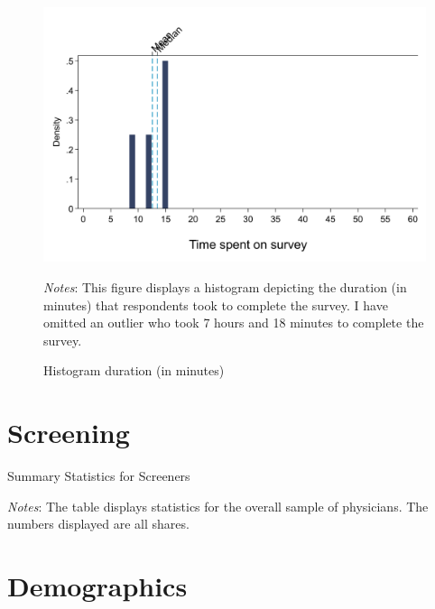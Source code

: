 \documentclass[11pt]{article}
\theoremstyle{definition}
\begin{document}
\begin{figure}[H]
	\centering
	\caption{Histogram duration (in minutes)}
	\label{fig:hist_duration}
	\begin{adjustbox}{max width=\textwidth}
		\includegraphics{Pre-Survey/figures/hist_duration.pdf}
	\end{adjustbox}
	\parbox{.9\linewidth}{
		\vspace{.2cm}
		\scriptsize{\emph{Notes}: This figure displays a histogram depicting the duration (in minutes) that respondents took to complete the survey. I have omitted an outlier who took 7 hours and 18 minutes to complete the survey.}
	}
\end{figure}

\clearpage

\section{Screening}\label{demo}

\begin{table}[H]
    \centering
    \caption{Summary Statistics for Screeners}
    	\begin{adjustbox}{max width=0.8\textwidth}

\end{adjustbox}
     \parbox{.9\linewidth}{
        	\vspace{.2cm}
        		\scriptsize{\scriptsize{{\emph{Notes}: The table displays statistics for the overall sample of physicians. The numbers displayed are all shares.}}}}
    \label{tab:screen_table}
\end{table}

\clearpage

\section{Demographics}\label{demo}
\end{document}
